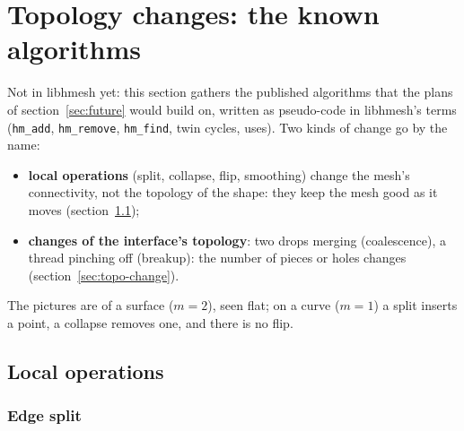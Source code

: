 \documentclass[10pt,a4paper]{article}
\theoremstyle{definition}
\newcommand{\fn}[1]{\texttt{#1}}
\begin{document}
\section{Topology changes: the known algorithms}
\label{sec:topo}

Not in libhmesh yet: this section gathers the published algorithms that
the plans of section~\ref{sec:future} would build on, written as
pseudo-code in libhmesh's terms (\fn{hm\_add}, \fn{hm\_remove},
\fn{hm\_find}, twin cycles, uses). Two kinds of change go by the name:
\begin{itemize}
  \item \textbf{local operations} (split, collapse, flip, smoothing) change
    the mesh's connectivity, not the topology of the shape: they keep the
    mesh good as it moves (section~\ref{sec:topo-local});
  \item \textbf{changes of the interface's topology}: two drops merging
    (coalescence), a thread pinching off (breakup): the number of pieces or
    holes changes (section~\ref{sec:topo-change}).
\end{itemize}
The pictures are of a surface ($m = 2$), seen flat; on a curve ($m = 1$) a
split inserts a point, a collapse removes one, and there is no flip.

\subsection{Local operations}
\label{sec:topo-local}

\subsubsection{Edge split}
\end{document}
